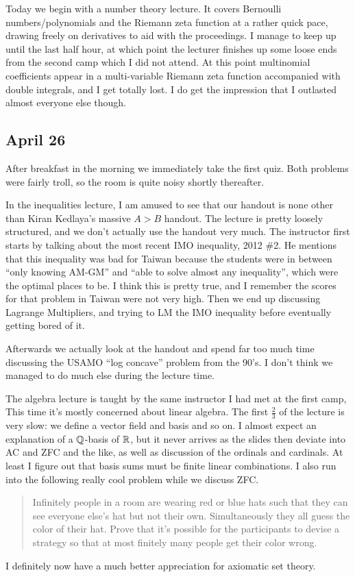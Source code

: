\documentclass[11pt]{scrreprt}
\begin{document}
Today we begin with a number theory lecture.
It covers Bernoulli numbers/polynomials and the Riemann zeta function at a rather quick pace,
drawing freely on derivatives to aid with the proceedings.
I manage to keep up until the last half hour,
at which point the lecturer finishes up some loose ends from the second camp which I did not attend.
At this point multinomial coefficients appear in a multi-variable Riemann zeta
function accompanied with double integrals, and I get totally lost.
I do get the impression that I outlasted almost everyone else though.

\subsection{April 26}
After breakfast in the morning we immediately take the first quiz.
Both problems were fairly troll, so the room is quite noisy shortly thereafter.

In the inequalities lecture, I am amused to see that our handout is none other
than Kiran Kedlaya's massive $A>B$ handout.
The lecture is pretty loosely structured, and we don't actually use the handout very much.
The instructor first starts by talking about the most recent IMO inequality, 2012 \#2.
He mentions that this inequality was bad for Taiwan because the students were in
between ``only knowing AM-GM'' and ``able to solve almost any inequality'',
which were the optimal places to be.
I think this is pretty true, and I remember the scores for that problem in Taiwan were not very high.
Then we end up discussing Lagrange Multipliers,
and trying to LM the IMO inequality before eventually getting bored of it.

Afterwards we actually look at the handout and spend far too much time
discussing the USAMO ``log concave'' problem from the 90's.
I don't think we managed to do much else during the lecture time.

The algebra lecture is taught by the same instructor I had met at the first camp,
This time it's mostly concerned about linear algebra.
The first $\frac 23$ of the lecture is very slow: we define a vector field and basis and so on.
I almost expect an explanation of a $\mathbb Q$-basis of $\mathbb R$,
but it never arrives as the slides then deviate into AC and ZFC and the like,
as well as discussion of the ordinals and cardinals.
At least I figure out that basis sums must be finite linear combinations.
I also run into the following really cool problem while we discuss ZFC.
\begin{quote}
  Infinitely people in a room are wearing red or blue hats such that they can
  see everyone else's hat but not their own.
  Simultaneously they all guess the color of their hat.
  Prove that it's possible for the participants to devise a strategy so that at
  most finitely many people get their color wrong.
\end{quote}
I definitely now have a much better appreciation for axiomatic set theory.
\end{document}

